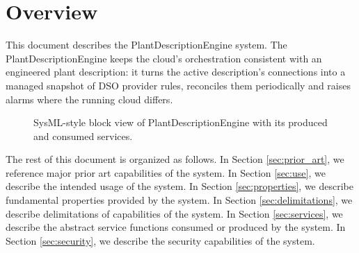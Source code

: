 \documentclass[a4paper]{arrowhead}
\begin{document}
\section{Overview}
\label{sec:overview}

This document describes the PlantDescriptionEngine system. The Plant\allowbreak{}Description\allowbreak{}Engine keeps the cloud's orchestration consistent with an engineered plant description: it turns the active description's connections into a managed snapshot of DSO provider rules, reconciles them periodically and raises alarms where the running cloud differs.

\begin{figure}[ht!]
  \centering
  \caption{SysML-style block view of PlantDescriptionEngine with its produced and consumed services.}
  \label{fig:system}
\end{figure}

The rest of this document is organized as follows.
In Section \ref{sec:prior_art}, we reference major prior art capabilities of the system.
In Section \ref{sec:use}, we describe the intended usage of the system.
In Section \ref{sec:properties}, we describe fundamental properties provided by the system.
In Section \ref{sec:delimitations}, we describe delimitations of capabilities of the system.
In Section \ref{sec:services}, we describe the abstract service functions consumed or produced by the system.
In Section \ref{sec:security}, we describe the security capabilities of the system.
\end{document}
